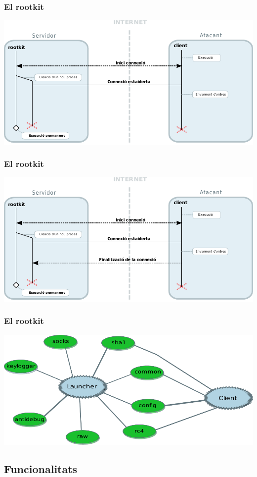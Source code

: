 \documentclass{beamer}
\begin{document}
\begin{frame}
	\frametitle{El rootkit}
	\includegraphics[scale=0.8,keepaspectratio]{arquitectura4.pdf}
\end{frame}

\begin{frame}
	\frametitle{El rootkit}
	\includegraphics[scale=0.8,keepaspectratio]{arquitectura5.pdf}
\end{frame}

\begin{frame}
	\frametitle{El rootkit}
	\includegraphics[scale=0.7,keepaspectratio]{arquitectura_moduls.pdf}
\end{frame}
\subsection{Funcionalitats}
\end{document}

